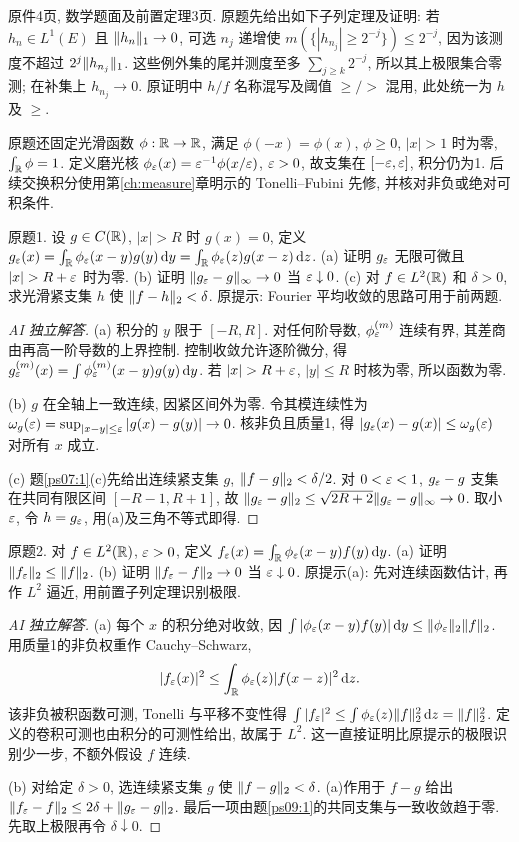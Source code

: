 \label{sec:ps09}
原件4页, 数学题面及前置定理3页. 原题先给出如下子列定理及证明: 若 $h_n\in L^1(E)$ 且 $\lVert h_n\rVert_1\to0$, 可选 $n_j$ 递增使 $m(\{|h_{n_j}|\ge2^{-j}\})\le2^{-j}$, 因为该测度不超过 $2^j\lVert h_{n_j}\rVert_1$. 这些例外集的尾并测度至多 $\sum_{j\ge k}2^{-j}$, 所以其上极限集合零测; 在补集上 $h_{n_j}\to0$. 原证明中 $h/f$ 名称混写及阈值 $\ge/>$ 混用, 此处统一为 $h$ 及 $\ge$.

原题还固定光滑函数 $\phi:\mathbb R\to\mathbb R$, 满足 $\phi(-x)=\phi(x)$, $\phi\ge0$, $|x|>1$ 时为零, $\int_\mathbb R\phi=1$. 定义磨光核 $\phi_\varepsilon(x)=\varepsilon^{-1}\phi(x/\varepsilon)$, $\varepsilon>0$, 故支集在 $[-\varepsilon,\varepsilon]$, 积分仍为1. 后续交换积分使用第\ref{ch:measure}章明示的 Tonelli--Fubini 先修, 并核对非负或绝对可积条件.
\begin{exercise}\label{ps09:1}
原题1. 设 $g\in C(\mathbb R)$, $|x|>R$ 时 $g(x)=0$, 定义 $g_\varepsilon(x)=\int_\mathbb R\phi_\varepsilon(x-y)g(y)\,\mathrm d y=\int_\mathbb R\phi_\varepsilon(z)g(x-z)\,\mathrm d z$. (a) 证明 $g_\varepsilon$ 无限可微且 $|x|>R+\eps$ 时为零. (b) 证明 $\lVert g_\varepsilon-g\rVert_\infty\to0$ 当 $\varepsilon\downarrow0$. (c) 对 $f\in L^2(\mathbb R)$ 和 $\delta>0$, 求光滑紧支集 $h$ 使 $\lVert f-h\rVert_2<\delta$. 原提示: Fourier 平均收敛的思路可用于前两题.
\end{exercise}
\begin{proof}[AI 独立解答]
(a) 积分的 $y$ 限于 $[-R,R]$. 对任何阶导数, $\phi_\varepsilon^{(m)}$ 连续有界, 其差商由再高一阶导数的上界控制. 控制收敛允许逐阶微分, 得 $g_\varepsilon^{(m)}(x)=\int\phi_\varepsilon^{(m)}(x-y)g(y)\,\mathrm d y$. 若 $|x|>R+\eps$, $|y|\le R$ 时核为零, 所以函数为零.

(b) $g$ 在全轴上一致连续, 因紧区间外为零. 令其模连续性为 $\omega_g(\varepsilon)=\sup_{|x-y|\le\varepsilon}|g(x)-g(y)|\to0$. 核非负且质量1, 得 $|g_\varepsilon(x)-g(x)|\le\omega_g(\varepsilon)$ 对所有 $x$ 成立.

(c) 题\ref{ps07:1}(c)先给出连续紧支集 $g$, $\lVert f-g\rVert_2<\delta/2$. 对 $0<\varepsilon<1$, $g_\varepsilon-g$ 支集在共同有限区间 $[-R-1,R+1]$, 故 $\lVert g_\varepsilon-g\rVert_2\le\sqrt{2R+2}\lVert g_\varepsilon-g\rVert_\infty\to0$. 取小 $\varepsilon$, 令 $h=g_\varepsilon$, 用(a)及三角不等式即得.
\end{proof}
\begin{exercise}\label{ps09:2}
原题2. 对 $f\in L^2(\mathbb R)$, $\varepsilon>0$, 定义 $f_\varepsilon(x)=\int_\mathbb R\phi_\varepsilon(x-y)f(y)\,\mathrm d y$. (a) 证明 $\lVert f_\varepsilon\rVert_2\le\lVert f\rVert_2$. (b) 证明 $\lVert f_\varepsilon-f\rVert_2\to0$ 当 $\varepsilon\downarrow0$. 原提示(a): 先对连续函数估计, 再作 $L^2$ 逼近, 用前置子列定理识别极限.
\end{exercise}
\begin{proof}[AI 独立解答]
(a) 每个 $x$ 的积分绝对收敛, 因 $\int|\phi_\varepsilon(x-y)f(y)|\,\mathrm d y\le\lVert \phi_\varepsilon\rVert_2\lVert f\rVert_2$. 用质量1的非负权重作 Cauchy--Schwarz,
\[
|f_\varepsilon(x)|^2\le\int_\mathbb R\phi_\varepsilon(z)|f(x-z)|^2\,\mathrm d z.
\]
该非负被积函数可测, Tonelli 与平移不变性得 $\int|f_\varepsilon|^2\le\int\phi_\varepsilon(z)\lVert f\rVert_2^2\,\mathrm d z=\lVert f\rVert_2^2$. 定义的卷积可测也由积分的可测性给出, 故属于 $L^2$. 这一直接证明比原提示的极限识别少一步, 不额外假设 $f$ 连续.

(b) 对给定 $\delta>0$, 选连续紧支集 $g$ 使 $\lVert f-g\rVert_2<\delta$. (a)作用于 $f-g$ 给出
$\lVert f_\varepsilon-f\rVert_2\le2\delta+\lVert g_\varepsilon-g\rVert_2$. 最后一项由题\ref{ps09:1}的共同支集与一致收敛趋于零. 先取上极限再令 $\delta\downarrow0$.
\end{proof}
